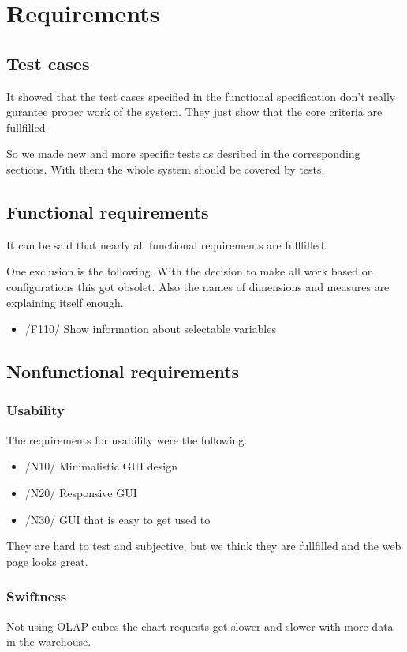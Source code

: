 \section{Requirements}\label{spec}


\subsection{Test cases}
It showed that the test cases specified in the functional specification
don't really gurantee proper work of the system. They just show
that the core criteria are fullfilled. 

So we made new and more specific tests as desribed in the
corresponding sections. With them the whole system should be covered by tests.

\subsection{Functional requirements}
It can be said that nearly all functional requirements are fullfilled.

One exclusion is the following. With the decision to make all work 
based on configurations this got obsolet. Also the names of dimensions
and measures are explaining itself enough.
\begin{itemize}
  \item /F110/ Show information about selectable variables
\end{itemize}

\subsection{Nonfunctional requirements}
\subsubsection{Usability}
The requirements for usability were the following. 
\begin{itemize}
  \item /N10/ Minimalistic GUI design
  \item /N20/ Responsive GUI
  \item /N30/ GUI that is easy to get used to
\end{itemize}
They are hard to test and subjective, but we think they are fullfilled
and the web page looks great.

\pagebreak[4]
\subsubsection{Swiftness}
Not using OLAP cubes the chart requests get slower and slower
with more data in the warehouse.

